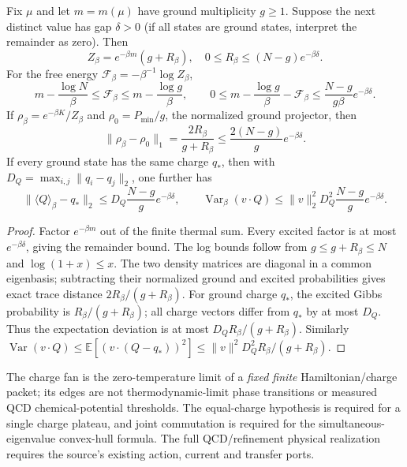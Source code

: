 \documentclass[12pt,a4paper]{article}
\begin{document}
\begin{theorem}
\label{p11:thm:cc14-charge-fan-error}
Fix $\mu$ and let $m=m(\mu)$ have ground multiplicity $g\ge1$.
Suppose the next distinct value has gap $\delta>0$ (if all states
are ground states, interpret the remainder as zero).  Then
\[
 \boxed{Z_\beta=e^{-\beta m}(g+R_\beta),\quad
 0\le R_\beta\le(N-g)e^{-\beta\delta}.}
\]
For the free energy $\mathcal F_\beta=-\beta^{-1}\log Z_\beta$,
\[
 \boxed{m-\frac{\log N}{\beta}\le\mathcal F_\beta
 \le m-\frac{\log g}{\beta},\qquad
 0\le m-\frac{\log g}{\beta}-\mathcal F_\beta
 \le\frac{N-g}{g\beta}e^{-\beta\delta}.}
\]
If $\rho_\beta=e^{-\beta K}/Z_\beta$ and
$\rho_0=P_{\min}/g$, the normalized ground projector, then
\[
 \boxed{\|\rho_\beta-\rho_0\|_1
 =\frac{2R_\beta}{g+R_\beta}
 \le\frac{2(N-g)}g e^{-\beta\delta}.}
\]
If every ground state has the same charge $q_*$, then with
$D_Q=\max_{i,j}\|q_i-q_j\|_2$, one further has
\[
 \|\langle Q\rangle_\beta-q_*\|_2
 \le D_Q\frac{N-g}{g}e^{-\beta\delta},
 \qquad
 \operatorname{Var}_\beta(v\cdot Q)
 \le \|v\|_2^2D_Q^2\frac{N-g}{g}e^{-\beta\delta}.
\]
\end{theorem}
\begin{proof}
Factor $e^{-\beta m}$ out of the finite thermal sum.
Every excited factor is at most $e^{-\beta\delta}$, giving the
remainder bound.  The log bounds follow from
$g\le g+R_\beta\le N$ and $\log(1+x)\le x$.
The two density matrices are diagonal in a common eigenbasis;
subtracting their normalized ground and excited probabilities gives
exact trace distance $2R_\beta/(g+R_\beta)$.
For ground charge $q_*$, the excited Gibbs probability is
$R_\beta/(g+R_\beta)$; all charge vectors differ from $q_*$
by at most $D_Q$.  Thus the expectation deviation is at most
$D_Q R_\beta/(g+R_\beta)$.  Similarly
$\operatorname{Var}(v\cdot Q)\le
\mathbb E[(v\cdot(Q-q_*))^2]
\le\|v\|^2D_Q^2 R_\beta/(g+R_\beta)$.
\end{proof}
\begin{remark}
The charge fan is the zero-temperature limit of a \emph{fixed finite}
Hamiltonian/charge packet; its edges are not thermodynamic-limit
phase transitions or measured QCD chemical-potential thresholds.
The equal-charge hypothesis is required for a single charge plateau,
and joint commutation is required for the simultaneous-eigenvalue
convex-hull formula.  The full QCD/refinement physical realization
requires the source's existing action, current and transfer ports.
\end{remark}
\end{document}

